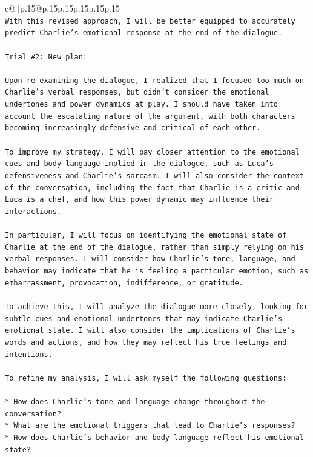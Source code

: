 \documentclass{article}
\begin{document}
{\begin{supertabular}{c@{$\;$}|p{.15\linewidth}@{}p{.15\linewidth}p{.15\linewidth}p{.15\linewidth}p{.15\linewidth}p{.15\linewidth}}
{{{\\ 
\texttt{With this revised approach, I will be better equipped to accurately predict Charlie's emotional response at the end of the dialogue.} \\
\\ 
\texttt{Trial \#2: New plan: } \\
\\ 
\texttt{Upon re{-}examining the dialogue, I realized that I focused too much on Charlie's verbal responses, but didn't consider the emotional undertones and power dynamics at play. I should have taken into account the escalating nature of the argument, with both characters becoming increasingly defensive and critical of each other.} \\
\\ 
\texttt{To improve my strategy, I will pay closer attention to the emotional cues and body language implied in the dialogue, such as Luca's defensiveness and Charlie's sarcasm. I will also consider the context of the conversation, including the fact that Charlie is a critic and Luca is a chef, and how this power dynamic may influence their interactions.} \\
\\ 
\texttt{In particular, I will focus on identifying the emotional state of Charlie at the end of the dialogue, rather than simply relying on his verbal responses. I will consider how Charlie's tone, language, and behavior may indicate that he is feeling a particular emotion, such as embarrassment, provocation, indifference, or gratitude.} \\
\\ 
\texttt{To achieve this, I will analyze the dialogue more closely, looking for subtle cues and emotional undertones that may indicate Charlie's emotional state. I will also consider the implications of Charlie's words and actions, and how they may reflect his true feelings and intentions.} \\
\\ 
\texttt{To refine my analysis, I will ask myself the following questions:} \\
\\ 
\texttt{* How does Charlie's tone and language change throughout the conversation?} \\
\texttt{* What are the emotional triggers that lead to Charlie's responses?} \\
\texttt{* How does Charlie's behavior and body language reflect his emotional state?} \\
}}}
\end{supertabular}}
\end{document}
